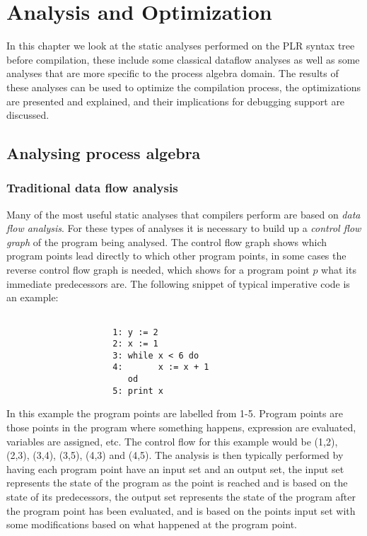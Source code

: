 \chapter{Analysis and Optimization}\label{ch:analysis_and_optimization}

	In this chapter we look at the static analyses performed on the PLR syntax 
	tree before compilation, these include some classical dataflow analyses 
	as well as some analyses that are more specific to the process algebra 
	domain. The results of these analyses can be used to optimize the 
	compilation process, the optimizations are presented and explained, and 
	their implications for debugging support are discussed.
	
\section{Analysing process algebra}
	
	\subsection{Traditional data flow analysis}
	Many of the most useful static analyses that compilers perform are based on 
	\textit{data flow analysis}. For these types of analyses it is necessary to 
	build up a \textit{control flow graph} of the program being analysed. The 
	control flow graph shows which program points lead directly to which other 
	program points, in some cases the reverse control flow graph is needed, 
	which shows for a program point $p$ what its immediate predecessors are. The 
	following snippet of typical imperative code is an example:
	\begin{Exa}
	\label{ex:control_flow}
	\begin{verbatim}
	
                     1: y := 2
                     2: x := 1
                     3: while x < 6 do
                     4: 	  x := x + 1   
                        od
                     5: print x
	\end{verbatim}
	\end{Exa}
	
	In this example the program points are labelled from 1-5. Program points are 
	those points in the program where something happens, expression are 
	evaluated, variables are assigned, etc. The control flow for this example 
	would be (1,2), (2,3), (3,4), (3,5), (4,3) and (4,5). The analysis is then 
	typically performed by having each program point have an input set and an 
	output set, the input set represents the state of the program as the point 
	is reached and is based on the state of its predecessors, the output set 
	represents the state of the program after the program point has been 
	evaluated, and is based on the points input set with some modifications 
	based on what happened at the program point. 
	
